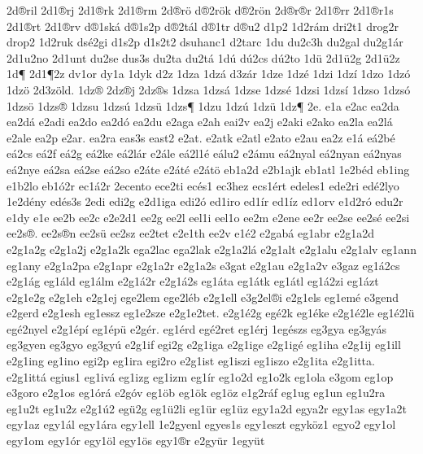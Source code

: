 {2d^^aeril
2d1^^aerj
2d1^^aerk
2d1^^aerm
2d^^aer^^f6
d^^ae2r^^f6k
d^^ae2r^^f6n
2d^^aer^^aer
2d1^^aerr
2d1^^aer1s
2d1^^aert
2d1^^aerv
d^^ae1sk^^e1
d^^ae1s2p
d^^ae2t^^e1l
d^^ae1tr
d^^aeu2
d1p2
1d2r^^e1m
dri2t1
drog2r
drop2
1d2ruk
ds^^e92gi
d1s2p
d1s2t2
dsuhanc1
d2tarc
1du
du2c3h
du2gal
du2g1^^e1r
2d1u2no
2d1unt
du2se
dus3s
du2ta
du2t^^e1
1d^^fa
d^^fa2cs
d^^fa2to
1d^^fc
2d1^^fc2g
2d1^^fc2z
1d^^b6
2d1^^b62z
dv1or
dy1a
1dyk
d2z
1dza
1dz^^e1
d3z^^e1r
1dze
1dz^^e9
1dzi
1dz^^ed
1dzo
1dz^^f3
1dz^^f6
2d3z^^f6ld.
1dz^^ae
2dz^^aej
2dz^^aes
1dzsa
1dzs^^e1
1dzse
1dzs^^e9
1dzsi
1dzs^^ed
1dzso
1dzs^^f3
1dzs^^f6
1dzs^^ae
1dzsu
1dzs^^fa
1dzs^^fc
1dzs^^b6
1dzu
1dz^^fa
1dz^^fc
1dz^^b6
2e.
e1a
e2ac
ea2da
ea2d^^e1
e2adi
ea2do
ea2d^^f3
ea2du
e2aga
e2ah
eai2v
ea2j
e2aki
e2ako
ea2la
ea2l^^e1
e2ale
ea2p
e2ar.
ea2ra
eas3s
east2
e2at.
e2atk
e2atl
e2ato
e2au
ea2z
e1^^e1
e^^e12b^^e9
e^^e12cs
e^^e12f
e^^e12g
e^^e12ke
e^^e12l^^e1r
e2^^e1le
e^^e12l1^^e9
e^^e1lu2
e2^^e1mu
e^^e12nyal
e^^e12nyan
e^^e12nyas
e^^e12nye
e^^e12sa
e^^e12se
e^^e12so
e2^^e1te
e2^^e1t^^e9
e2^^e1t^^f6
eb1a2d
e2b1ajk
eb1atl
1e2b^^e9d
eb1ing
e1b2lo
eb1^^f32r
ec1^^e12r
2ecento
ece2ti
ec^^e9s1
ec3hez
ecs1^^e9rt
edeles1
ede2ri
ed^^e92lyo
1e2d^^e9ny
ed^^e9s3s
2edi
edi2g
e2d1iga
edi2^^f3
ed1iro
ed1^^edr
ed1^^edz
ed1orv
e1d2r^^f3
edu2r
e1dy
e1e
ee2b
ee2c
e2e2d1
ee2g
ee2l
eel1i
eel1o
ee2m
e2ene
ee2r
ee2se
ee2s^^e9
ee2si
ee2s^^ae.
ee2s^^aen
ee2s^^fc
ee2sz
ee2tet
e2e1th
ee2v
e1^^e92
e2gab^^e1
eg1abr
e2g1a2d
e2g1a2g
e2g1a2j
e2g1a2k
ega2lac
ega2lak
e2g1a2l^^e1
e2g1alt
e2g1alu
e2g1alv
eg1ann
eg1any
e2g1a2pa
e2g1apr
e2g1a2r
e2g1a2s
e3gat
e2g1au
e2g1a2v
e3gaz
eg1^^e12cs
e2g1^^e1g
eg1^^e1ld
eg1^^e1lm
e2g1^^e12r
e2g1^^e12s
eg1^^e1ta
eg1^^e1tk
eg1^^e1tl
eg1^^e12zi
eg1^^e1zt
e2g1e2g
e2g1eh
e2g1ej
ege2lem
ege2l^^e9b
e2g1ell
e3g2el^^aei
e2g1els
eg1em^^e9
e3gend
e2gerd
e2g1esh
eg1essz
eg1e2sze
e2g1e2tet.
e2g1^^e92g
eg^^e92k
eg1^^e9ke
e2g1^^e92le
eg1^^e92l^^fc
eg^^e92nyel
e2g1^^e9p^^ed
eg1^^e9p^^fc
e2g^^e9r.
eg1^^e9rd
eg^^e92ret
eg1^^e9rj
1eg^^e9szs
eg3gya
eg3gy^^e1s
eg3gyen
eg3gyo
eg3gy^^fa
e2g1if
egi2g
e2g1iga
e2g1ige
e2g1ig^^e9
eg1iha
e2g1ij
eg1ill
e2g1ing
eg1ino
egi2p
eg1ira
egi2ro
e2g1ist
eg1iszi
eg1iszo
e2g1ita
e2g1itta.
e2g1itt^^e1
egius1
eg1iv^^e1
eg1izg
eg1izm
eg1^^edr
eg1o2d
eg1o2k
eg1ola
e3gom
eg1op
e3goro
e2g1os
eg1^^f3r^^e1
e2g^^f3v
eg1^^f6b
eg1^^f6k
eg1^^f6z
e1g2r^^e1f
eg1ug
eg1un
eg1u2ra
eg1u2t
eg1u2z
e2g1^^fa2
eg^^fc2g
eg1^^fc2li
eg1^^fcr
eg1^^fcz
egy1a2d
egya2r
egy1as
egy1a2t
egy1az
egy1^^e1l
egy1^^e1ra
egy1ell
1e2gyenl
egyes1s
egy1eszt
egyk^^f6z1
egyo2
egy1ol
egy1om
egy1^^f3r
egy1^^f6l
egy1^^f6s
egy1^^aer
e2gy^^fcr
1egy^^fct
}

